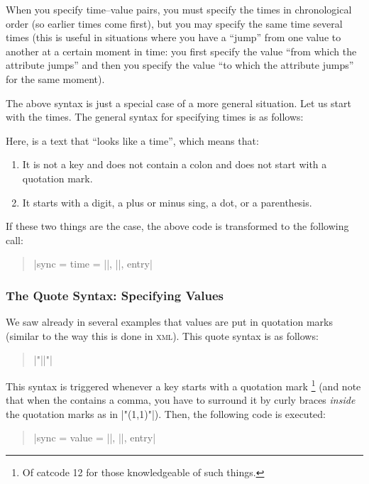 When you specify time--value pairs, you must specify the times in chronological
order (so earlier times come first), but you may specify the same time several
times (this is useful in situations where you have a ``jump'' from one value to
another at a certain moment in time: you first specify the value ``from which
the attribute jumps'' and then you specify the value ``to which the attribute
jumps'' for the same moment).

The above syntax is just a special case of a more general situation. Let us
start with the times. The general syntax for specifying times is as follows:
%
\begin{quote}
    \normalfont
     
\end{quote}

Here,  is a text that ``looks like a time'', which means that:
%
\begin{enumerate}
    \item It is not a key and does not contain a colon and does not start with
        a quotation mark.
    \item It starts with a digit, a plus or minus sing, a dot, or a
        parenthesis.
\end{enumerate}

If these two things are the case, the above code is transformed to the
following call:
%
\begin{quote}
    \normalfont
    |sync = {time = ||, ||, entry}|
\end{quote}


\subsubsection{The Quote Syntax: Specifying Values}

We saw already in several examples that values are put in quotation marks
(similar to the way this is done in \textsc{xml}). This quote syntax is as
follows:
%
\begin{quote}
    \normalfont
    |"||"|  
\end{quote}

This syntax is triggered whenever a key starts with a quotation mark%
\footnote{Of catcode 12 for those knowledgeable of such things.} (and note that
when the  contains a comma, you have to surround it by curly braces
\emph{inside} the quotation marks as in |"{(1,1)}"|). Then, the following code
is executed:
%
\begin{quote}
    \normalfont
    |sync = {value = ||, ||, entry}|
\end{quote}

